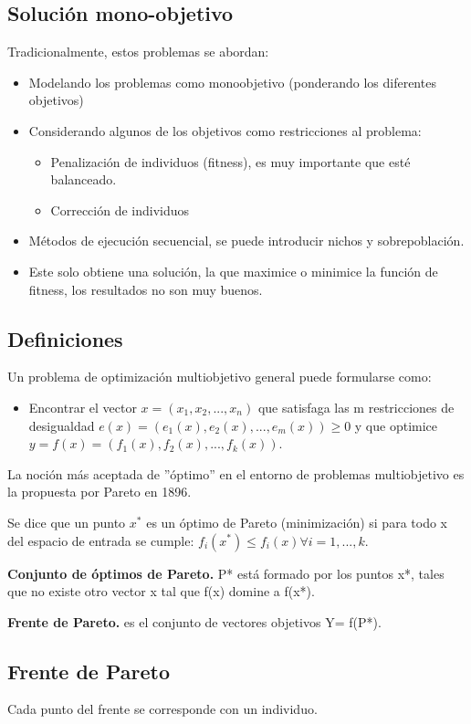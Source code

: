 \documentclass[12pt, twoside, openright]{report} %
\begin{document}
\subsection{Solución mono-objetivo}
Tradicionalmente, estos problemas se abordan:
\begin{itemize}
	\item Modelando los problemas como monoobjetivo (ponderando los diferentes objetivos)
	\item Considerando algunos de los objetivos como restricciones al problema:
	\begin{itemize}
		\item Penalización de individuos (fitness), es muy importante que esté balanceado.
		\item Corrección de individuos
	\end{itemize}
	\item Métodos de ejecución secuencial, se puede introducir nichos y sobrepoblación.
	\item Este solo obtiene una solución, la que maximice o minimice la función de fitness, los resultados no son muy buenos.
\end{itemize}

\subsection{Definiciones}
Un problema de optimización multiobjetivo general puede formularse como: 
\begin{itemize}
	\item Encontrar el vector $x = (x_1, x_2, ..., x_n)$ que satisfaga las m restricciones de desigualdad $e(x) = (e_1(x), e_2(x), ..., e_m(x)) \geq 0$ y que optimice $y = f (x) = (f_1(x), f_2(x), ..., f_k(x))$.
\end{itemize}

La noción más aceptada de ''óptimo'' en el entorno de problemas multiobjetivo es la propuesta por Pareto en 1896.

Se dice que un punto $x^*$ es un óptimo de Pareto (minimización) si para todo x del espacio de entrada se cumple: $f_i(x^*) \leq f_i(x) \forall i = 1, ..., k$.

\textbf{Conjunto de óptimos de Pareto.} P* está formado por los puntos x*, tales que no existe otro vector x tal que f(x) domine a f(x*).

\textbf{Frente de Pareto.} es el conjunto de vectores objetivos Y= f(P*).

\subsection{Frente de Pareto}
Cada punto del frente se corresponde con un individuo.
\end{document}
